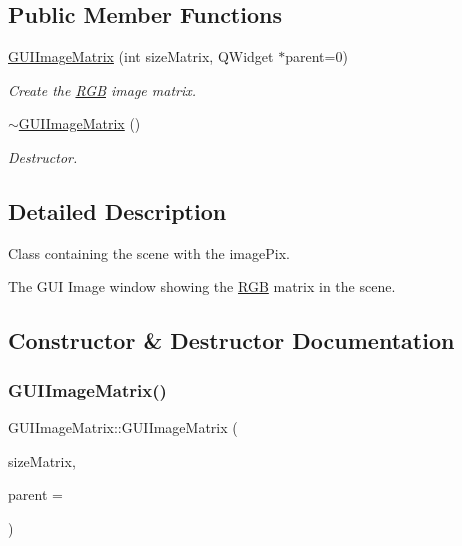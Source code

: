 \subsection*{Public Member Functions}
\begin{DoxyCompactItemize}
\item 
\mbox{\hyperlink{class_g_u_i_image_matrix_ac5ec90dd56b60e51c7e5839ac999398e}{G\+U\+I\+Image\+Matrix}} (int size\+Matrix, Q\+Widget $\ast$parent=0)
\begin{DoxyCompactList}\small\item\em Create the \mbox{\hyperlink{class_r_g_b}{R\+GB}} image matrix. \end{DoxyCompactList}\item 
\mbox{\hyperlink{class_g_u_i_image_matrix_af36fa210852ae587d91697c3cb4d148b}{$\sim$\+G\+U\+I\+Image\+Matrix}} ()
\begin{DoxyCompactList}\small\item\em Destructor. \end{DoxyCompactList}\end{DoxyCompactItemize}


\subsection{Detailed Description}
Class containing the scene with the image\+Pix. 

The G\+UI Image window showing the \mbox{\hyperlink{class_r_g_b}{R\+GB}} matrix in the scene. 

\subsection{Constructor \& Destructor Documentation}
\mbox{\label{class_g_u_i_image_matrix_ac5ec90dd56b60e51c7e5839ac999398e}} 
\subsubsection{\texorpdfstring{G\+U\+I\+Image\+Matrix()}{GUIImageMatrix()}}
{\footnotesize\ttfamily G\+U\+I\+Image\+Matrix\+::\+G\+U\+I\+Image\+Matrix (\begin{DoxyParamCaption}\item[{int}]{size\+Matrix,  }\item[{Q\+Widget $\ast$}]{parent = {} }\end{DoxyParamCaption})}



